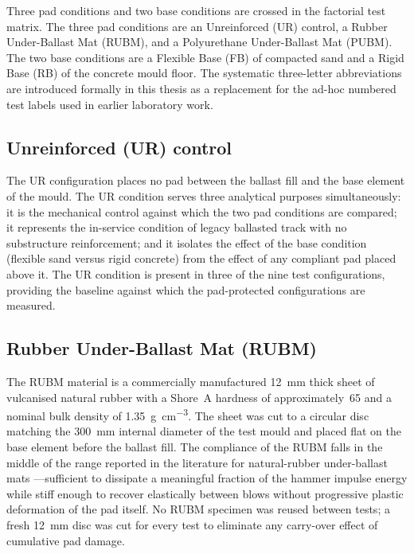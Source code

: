 Three pad conditions and two base conditions are crossed in the factorial
test matrix. The three pad conditions are an Unreinforced (\gls{UR})
control, a Rubber Under-Ballast Mat (\gls{RUBM}), and a Polyurethane
Under-Ballast Mat (\gls{PUBM}). The two base conditions are a Flexible Base
(\gls{FB}) of compacted sand and a Rigid Base (\gls{RB}) of the concrete
mould floor. The systematic three-letter abbreviations are introduced
formally in this thesis as a replacement for the ad-hoc numbered test
labels used in earlier laboratory work.

\subsection{Unreinforced (UR) control}
\label{sec:meth-UR}

The \gls{UR} configuration places no pad between the ballast fill and the
base element of the mould. The \gls{UR} condition serves three analytical
purposes simultaneously: it is the mechanical control against which the two
pad conditions are compared; it represents the in-service condition of
legacy ballasted track with no substructure reinforcement; and it isolates
the effect of the base condition (flexible sand versus rigid concrete) from
the effect of any compliant pad placed above it. The \gls{UR} condition is
present in three of the nine test configurations, providing the baseline
against which the pad-protected configurations are measured.

\subsection{Rubber Under-Ballast Mat (RUBM)}
\label{sec:meth-RUBM}

The \gls{RUBM} material is a commercially manufactured \SI{12}{\milli\metre}
thick sheet of vulcanised natural rubber with a Shore~A hardness of
approximately~65 and a nominal bulk density of
\SI{1.35}{\gram\per\centi\metre\cubed}. The sheet was cut to a circular disc
matching the \SI{300}{\milli\metre} internal diameter of the test mould and
placed flat on the base element before the ballast fill. The compliance of
the \gls{RUBM} falls in the middle of the range reported in the literature
for natural-rubber under-ballast mats
\citep{Navaratnarajah2017, Ngo2019}---sufficient to dissipate a meaningful
fraction of the hammer impulse energy while stiff enough to recover
elastically between blows without progressive plastic deformation of the pad
itself. No \gls{RUBM} specimen was reused between tests; a fresh
\SI{12}{\milli\metre} disc was cut for every test to eliminate any
carry-over effect of cumulative pad damage.

